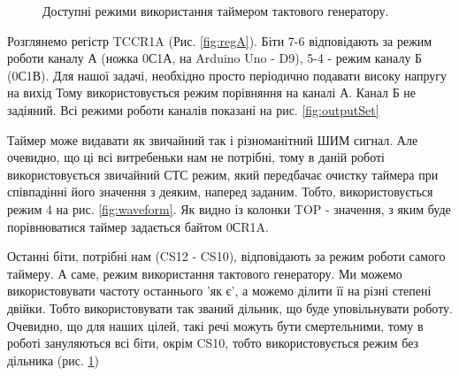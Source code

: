 \begin{figure}[h]
\caption{Доступні режими використання таймером тактового генератору.}
\label{fig:prescaler}
\end{figure}
Розглянемо регістр TCCR1A (Рис. \ref{fig:regA}). Біти 7-6 відповідають за режим роботи каналу А (ножка 0С1А, на Arduino Uno - D9), 5-4 - режим каналу Б (0С1В). Для нашої задачі, необхідно просто періодично подавати високу напругу на вихід Тому використовується режим порівняння на каналі А. Канал Б не задіяний. Всі режими роботи каналів показані на рис. \ref{fig:outputSet}

Таймер може видавати як звичайний так і різноманітний ШИМ сигнал. Але очевидно, що ці всі витребеньки нам не потрібні, тому в даній роботі використовується звичайний СТС режим, який передбачає очистку таймера при співпадінні його значення з деяким, наперед заданим. Тобто, використовується режим 4 на рис. \ref{fig:waveform}. Як видно із колонки TOP - значення, з яким буде порівнюватися таймер задається байтом 0СR1A.

Останні біти, потрібні нам (CS12 - CS10), відповідають за режим роботи самого таймеру. А саме, режим використання тактового генератору. Ми можемо використовувати частоту останнього 'як є', а можемо ділити її на різні степені двійки. Тобто використовувати так званий дільник, що буде уповільнувати роботу. Очевидно, що для наших цілей, такі речі можуть бути смертельними, тому в роботі зануляються всі біти, окрім CS10, тобто використовується режим без дільника (рис. \ref{fig:prescaler})
